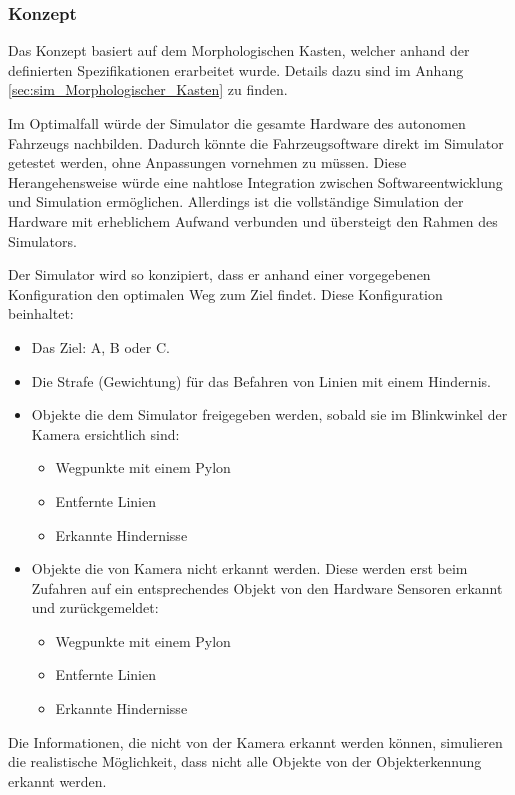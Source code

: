 \documentclass[../main.tex]{subfiles}
\begin{document}
\subsubsection{Konzept}

Das Konzept basiert auf dem Morphologischen Kasten, welcher anhand der definierten Spezifikationen erarbeitet wurde. Details dazu sind im Anhang \ref{sec:sim_Morphologischer_Kasten} zu finden.

Im Optimalfall würde der Simulator die gesamte Hardware des autonomen Fahrzeugs nachbilden. Dadurch könnte die Fahrzeugsoftware direkt im Simulator getestet werden, ohne Anpassungen vornehmen zu müssen. Diese Herangehensweise würde eine nahtlose Integration zwischen Softwareentwicklung und Simulation ermöglichen. Allerdings ist die vollständige Simulation der Hardware mit erheblichem Aufwand verbunden und übersteigt den Rahmen des Simulators.

Der Simulator wird so konzipiert, dass er anhand einer vorgegebenen Konfiguration den optimalen Weg zum Ziel findet. Diese Konfiguration beinhaltet:
\begin{itemize}
    \item Das Ziel: A, B oder C.
    \item Die Strafe (Gewichtung) für das Befahren von Linien mit einem Hindernis.
    \item Objekte die dem Simulator freigegeben werden, sobald sie im Blinkwinkel der Kamera ersichtlich sind:
     \begin{itemize}
        \item Wegpunkte mit einem Pylon 
        \item Entfernte Linien
        \item Erkannte Hindernisse
     \end{itemize}
   \item Objekte die von Kamera nicht erkannt werden. Diese werden erst beim Zufahren auf ein entsprechendes Objekt von den Hardware Sensoren erkannt und zurückgemeldet:
    \begin{itemize}
      \item Wegpunkte mit einem Pylon 
      \item Entfernte Linien
      \item Erkannte Hindernisse
    \end{itemize}
\end{itemize}

Die Informationen, die nicht von der Kamera erkannt werden können, simulieren die realistische Möglichkeit, dass nicht alle Objekte von der Objekterkennung erkannt werden.  
\end{document}
